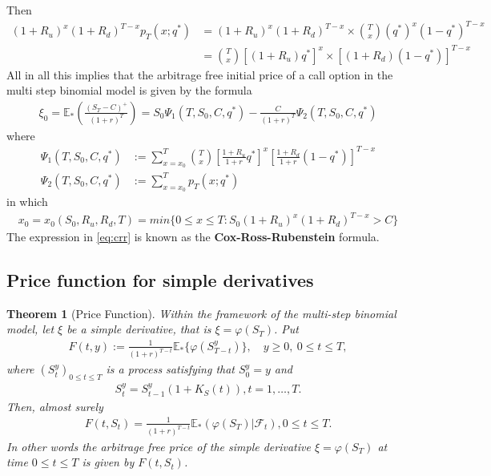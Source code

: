 \documentclass{article}
\newtheorem{theorem}{Theorem}[section]
\theoremstyle{definition}
\numberwithin{equation}{section}
\begin{document}
Then
\begin{align}
   (1+R_u)^x(1+R_d)^{T-x} p_T(x; q^*) &= (1+R_u)^x(1+R_d)^{T-x} \times \binom{T}{x} (q^*)^x(1-q^*)^{T-x}\\
&= \binom{T}{x} [(1 + R_u)q^*]^x \times [(1+R_d)(1-q^*)]^{T-x}
\end{align}
All in all this implies that the arbitrage free initial price of a call option in the multi step binomial model is given by the formula
\begin{align}\label{eq:crr}
    \xi_0 = \mathbb{E}_* \left( \frac{(S_T - C)^+}{(1+r)^T} \right) = S_0 \Psi_1(T, S_0, C, q^*) - \frac{C}{(1+r)^T} \Psi_2(T, S_0, C, q^*)
\end{align}
where 
\begin{align}
    \Psi_1 (T, S_0, C, q^*) &:= \sum_{x = x_0}^T \binom{T}{x} \left[ \frac{1 + R_u}{1+r} q^* \right]^x\left[ \frac{1+R_d}{1+r}(1 - q^*) \right]^{T-x}\\
    \Psi_2 (T, S_0, C, q^*) &:= \sum_{x = x_0}^T p_T(x; q^*)
\end{align}
in which 
\begin{align}
    x_0 = x_0(S_0, R_u, R_d, T) = min\{ 0 \leq x \leq T : S_0(1+R_u)^x(1+R_d)^{T-x} > C\}
\end{align}
The expression in \eqref{eq:crr} is known as the \textbf{Cox-Ross-Rubenstein} formula.

\subsection{Price function for simple derivatives}

\begin{theorem}[Price Function]\label{th:price_function}
    Within the framework of the multi-step binomial model, let $\xi$ be a simple derivative, that is $\xi = \varphi(S_T)$. 
    Put
    \begin{align}
        F(t,y) := \frac{1}{(1+r)^{T-t}} \mathbb{E}_* \{ \varphi (S_{T-t}^y) \}, \quad y \geq 0, \ 0 \leq t \leq T, 
    \end{align}
    where $(S_t^y)_{0 \leq t \leq T}$ is a process satisfying that $S_0^y = y$ and 
    \begin{align}
        S_t^y = S_{t-1}^y(1 + K_S(t)), t = 1, \ldots, T. 
    \end{align}
    Then, almost surely
    \begin{align}
        F(t, S_t) = \frac{1}{(1+r)^{T-t}} \mathbb{E}_* (\varphi(S_T) | \mathscr{F}_t), 0 \leq t \leq T. 
    \end{align}
    In other words the arbitrage free price of the simple derivative $\xi = \varphi(S_T)$ at time $0 \leq t \leq T$ is given by $F(t, S_t)$. 
\end{theorem}
\end{document}
